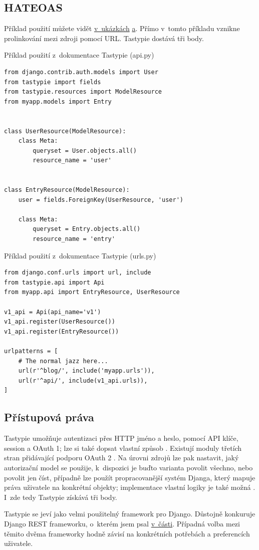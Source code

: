 \subsection{HATEOAS}\label{hateoas}

Příklad použití můžete vidět \protect\hyperlink{code:tastypie}{v~ukázkách} \protect\hyperlink{code:tastypie2}{a}. Přímo v~tomto příkladu vznikne prolinkování mezi zdroji pomocí URL. Tastypie dostává tři body.

\begin{listing}[htbp]
\caption{{\label{code:tastypie}Příklad použití z~dokumentace Tastypie (api.py) \autocite{tastypiedoc}}}
\begin{verbatim}
from django.contrib.auth.models import User
from tastypie import fields
from tastypie.resources import ModelResource
from myapp.models import Entry


class UserResource(ModelResource):
    class Meta:
        queryset = User.objects.all()
        resource_name = 'user'


class EntryResource(ModelResource):
    user = fields.ForeignKey(UserResource, 'user')

    class Meta:
        queryset = Entry.objects.all()
        resource_name = 'entry'
\end{verbatim}
\end{listing}

\begin{listing}[htbp]
\caption{{\label{code:tastypie2}Příklad použití z~dokumentace Tastypie (urls.py) \autocite{tastypiedoc}}}
\begin{verbatim}
from django.conf.urls import url, include
from tastypie.api import Api
from myapp.api import EntryResource, UserResource

v1_api = Api(api_name='v1')
v1_api.register(UserResource())
v1_api.register(EntryResource())

urlpatterns = [
    # The normal jazz here...
    url(r'^blog/', include('myapp.urls')),
    url(r'^api/', include(v1_api.urls)),
]
\end{verbatim}
\end{listing}

\subsection{Přístupová práva}\label{pux159uxedstupovuxe1-pruxe1va}

Tastypie umožňuje autentizaci přes HTTP jméno a heslo, pomocí API klíče, session a OAuth 1; lze si také dopsat vlastní způsob \autocite{tastypieauth}. Existují moduly třetích stran přidávající podporu OAuth 2 \autocite{tastypieoath}. Na úrovni zdrojů lze pak nastavit, jaký autorizační model se použije, k~dispozici je buďto varianta povolit všechno, nebo povolit jen číst, případně lze použít propracovanější systém Djanga, který mapuje práva uživatele na konkrétní objekty; implementace vlastní logiky je také možná \autocite{tastypieauto}. I~zde tedy Tastypie získává tři body.

Tastypie se jeví jako velmi použitelný framework pro Django. Důstojně konkuruje Django REST frameworku, o~kterém jsem psal \protect\hyperlink{drf:fra}{v~části}. Případná volba mezi těmito dvěma frameworky hodně závisí na konkrétních potřebách a preferencích uživatele.

